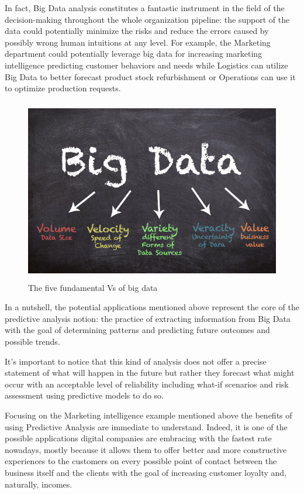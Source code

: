 In fact, Big Data analysis constitutes a fantastic instrument in the field of the decision-making throughout the whole organization pipeline: the support of the data could potentially minimize the risks and reduce the errors caused by possibly wrong human intuitions at any level. For example, the Marketing department could potentially leverage big data for increasing marketing intelligence predicting customer behaviors and needs while Logistics can utilize Big Data to better forecast product stock refurbishment or Operations can use it to optimize production requests.

\vspace{0.5cm}
\begin{figure}[htbp]
  \centering
    \includegraphics[height=8cm]{images/bigdata.png}
  \caption{The five fundamental Vs of big data }
  \label{fig:bigdata}
\end{figure}
\vspace{0.5cm}

In a nutshell, the potential applications mentioned above represent the core of the predictive analysis notion: the practice of extracting information from Big Data with the goal of determining patterns and predicting future outcomes and possible trends. 

It's important to notice that this kind of analysis does not offer a precise statement of what will happen in the future but rather they forecast what might occur with an acceptable level of reliability including what-if scenarios and risk assessment using predictive models to do so.

Focusing on the Marketing intelligence example mentioned above the benefits of using Predictive Analysis are immediate to understand. Indeed, it is one of the possible applications digital companies are embracing with the fastest rate nowadays, mostly because it allows them to offer better and more constructive experiences to the customers on every possible point of contact between the business itself and the clients with the goal of increasing customer loyalty and, naturally, incomes.

